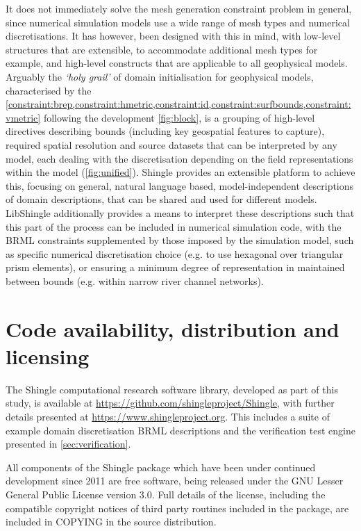 \documentclass[a4paper, 10pt]{book}
\providecommand{\shingle}{Shingle\xspace}
\providecommand{\libshingle}{LibShingle\xspace}
\providecommand{\brml}{BRML\xspace}
\newcommand{\constraints}{\cref{constraint:brep,constraint:hmetric,constraint:id,constraint:surfbounds,constraint:vmetric}\xspace}
\begin{document}
It does not immediately solve the mesh generation constraint problem in general, since numerical simulation models use a wide range of mesh types and numerical discretisations.
It has however, been designed with this in mind,
with low-level structures that are extensible,
to accommodate additional mesh types for example,
and high-level constructs that are applicable to all geophysical models.
%
Arguably the \emph{`holy grail'} of domain initialisation for geophysical models,
characterised by the
\constraints
following the development
\cref{fig:block},
is a grouping of high-level directives describing bounds (including key geospatial features to capture), required spatial resolution and source datasets
that can be interpreted by any model,
each dealing with the discretisation depending on the field representations within the model (\cref{fig:unified}).
%
\shingle provides an extensible platform to achieve this, focusing on general, natural language based, model-independent descriptions of domain descriptions, that can be shared and used for different models.
%
\libshingle additionally provides a means to interpret these descriptions such that this part of the process can be included in numerical simulation code, with the \brml constraints supplemented by those imposed by the simulation model, such as specific numerical discretisation choice (e.g. to use hexagonal over triangular prism elements), or 
ensuring a minimum degree of representation in maintained between bounds (e.g. within narrow river channel networks).









\chapter{Code availability, distribution and licensing}
\label{sec:distribution}
%
%
The \shingle computational research software library, developed as part of this study, is 
available at \url{https://github.com/shingleproject/Shingle},
with further details presented at
\url{https://www.shingleproject.org}.
%
This includes a suite of example domain discretisation \brml descriptions and the verification test engine presented in \cref{sec:verification}.

All components of the \shingle package
which have been under continued development since 2011
are free software, being released under the GNU Lesser General Public License version 3.0. 
%
Full details of the license, including the compatible copyright notices of third party routines included in the package, are included in COPYING in the source distribution.
\end{document}
